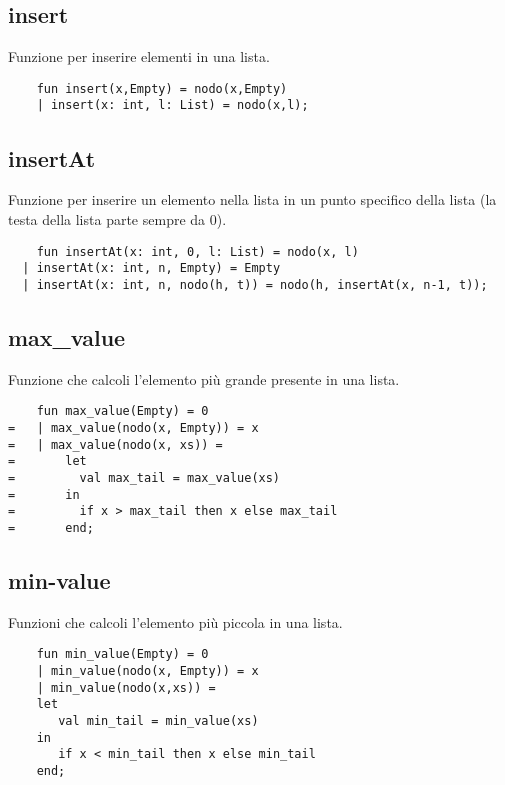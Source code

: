 \subsection{insert}

Funzione per inserire elementi in una lista.

\begin{lstlisting}
    fun insert(x,Empty) = nodo(x,Empty)
    | insert(x: int, l: List) = nodo(x,l);
\end{lstlisting}

\subsection{insertAt}

Funzione per inserire un elemento nella lista in un punto specifico della lista (la testa della lista parte sempre da 0).

\begin{lstlisting}
    fun insertAt(x: int, 0, l: List) = nodo(x, l)
  | insertAt(x: int, n, Empty) = Empty
  | insertAt(x: int, n, nodo(h, t)) = nodo(h, insertAt(x, n-1, t));

\end{lstlisting}

\subsection{max_value}

Funzione che calcoli l'elemento più grande presente in una lista.

\begin{lstlisting}
    fun max_value(Empty) = 0
=   | max_value(nodo(x, Empty)) = x
=   | max_value(nodo(x, xs)) =
=       let
=         val max_tail = max_value(xs)
=       in
=         if x > max_tail then x else max_tail
=       end;
\end{lstlisting}

\subsection{min-value}

Funzioni che calcoli l'elemento più piccola in una lista.

\begin{lstlisting}
    fun min_value(Empty) = 0
    | min_value(nodo(x, Empty)) = x
    | min_value(nodo(x,xs)) = 
	let
	   val min_tail = min_value(xs)
	in
	   if x < min_tail then x else min_tail
	end;
\end{lstlisting}

